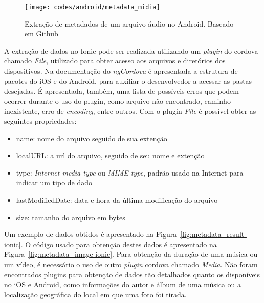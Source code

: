 \begin{figure}[H]
	\centering
	\texttt{[image: codes/android/metadata\_midia]}
	\caption[Extração de metadados de um arquivo áudio no Android]{Extração de metadados de um arquivo áudio no Android. Baseado em Github\protect\footnotemark}
	\label{fig:metadata_midia-android}
\end{figure}


A extração de dados no Ionic pode ser realizada utilizando um \textit{plugin} do cordova chamado \textit{File}, utilizado para obter 
acesso aos arquivos e diretórios dos dispositivos. Na documentação do \textit{ngCordova} é apresentada a estrutura de pacotes do iOS e 
do Android, para auxiliar o desenvolvedor a acessar as pastas desejadas. É apresentada, também, uma lista de possíveis erros
que podem ocorrer durante o uso do plugin, como arquivo não encontrado, caminho inexistente, erro de \textit{encoding}, entre outros.
Com o plugin \textit{File} é possível obter as seguintes propriedades:
 
\begin{itemize}
	\item name: nome do arquivo seguido de sua extenção
	\item localURL: a url do arquivo, seguido de seu nome e extenção
	\item type: \textit{Internet media type} ou \textit{MIME type}, padrão usado na Internet para indicar um tipo de dado
	\item lastModifiedDate: data e hora da última modificação do arquivo
	\item size: tamanho do arquivo em bytes
\end{itemize}

Um exemplo de dados obtidos é apresentado na Figura~\ref{fig:metadata_result-ionic}. O código usado para 
obtenção destes dados é apresentado na Figura~\ref{fig:metadata_image-ionic}.
Para obtenção da duração de uma música ou um vídeo, é necessário o uso de outro  \textit{plugin} cordova chamado \textit{Media}.
Não foram encontrados plugins para obtenção de dados tão detalhados quanto os disponíveis no iOS e Android, como informações do autor 
e álbum de uma música ou a localização geográfica do local em que uma foto foi tirada.

